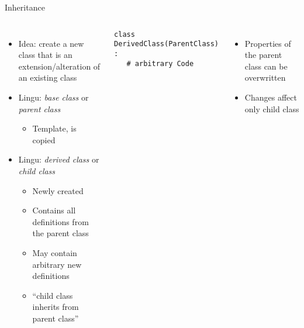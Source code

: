 
\begin{frame}[fragile]{Inheritance}
%
\begin{columns}[T]
\begin{itemize}
\item Idea: create a new class that is an extension/alteration of an existing class
\item Lingu: \emph{base class} or \emph{parent class}
	\begin{itemize}
	\item Template, is copied
	\end{itemize}
\item Lingu: \emph{derived class} or \emph{child class}
	\begin{itemize}
	\item Newly created
	\item Contains all definitions from the parent class
	\item May contain arbitrary new definitions
	\item \enquote{child class inherits from parent class}
	\end{itemize}
\end{itemize}
%
\vspace{-6pt}
\begin{codebox}
\begin{verbatim}
class DerivedClass(ParentClass) :
   # arbitrary Code
\end{verbatim}
\end{codebox}
%
\begin{itemize}
\item Properties of the parent class can be overwritten
\item Changes affect only child class
\end{itemize}
\end{columns}
%
\end{frame}


